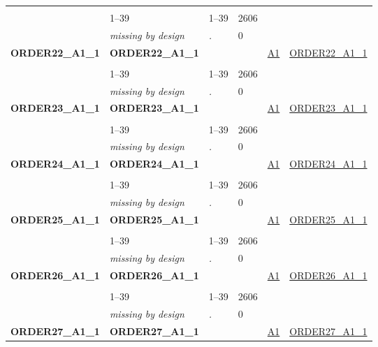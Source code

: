 \begin{longtable}{| L{2.45cm} | L{6cm} | C{1.5cm} | R{1cm} | C{2.25cm} | C{2.25cm} |}
   &  &  &  &  &  \\ 
   & 1--39 & 1--39 & 2606 &  &  \\ 
   & \textit{missing by design} & \textit{.} & 0 &  &  \\ 
   \midrule
\textbf{ORDER22\_A1\_1}\label{var:ORDER22:A1:1} & \textbf{ORDER22\_A1\_1} &  &  & \hyperref[A1]{A1} & \hyperref[var:suf:ORDER22:A1:1]{ORDER22\_A1\_1} \\ 
   &  &  &  &  &  \\ 
   & 1--39 & 1--39 & 2606 &  &  \\ 
   & \textit{missing by design} & \textit{.} & 0 &  &  \\ 
   \midrule
\textbf{ORDER23\_A1\_1}\label{var:ORDER23:A1:1} & \textbf{ORDER23\_A1\_1} &  &  & \hyperref[A1]{A1} & \hyperref[var:suf:ORDER23:A1:1]{ORDER23\_A1\_1} \\ 
   &  &  &  &  &  \\ 
   & 1--39 & 1--39 & 2606 &  &  \\ 
   & \textit{missing by design} & \textit{.} & 0 &  &  \\ 
   \midrule
\textbf{ORDER24\_A1\_1}\label{var:ORDER24:A1:1} & \textbf{ORDER24\_A1\_1} &  &  & \hyperref[A1]{A1} & \hyperref[var:suf:ORDER24:A1:1]{ORDER24\_A1\_1} \\ 
   &  &  &  &  &  \\ 
   & 1--39 & 1--39 & 2606 &  &  \\ 
   & \textit{missing by design} & \textit{.} & 0 &  &  \\ 
   \midrule
\textbf{ORDER25\_A1\_1}\label{var:ORDER25:A1:1} & \textbf{ORDER25\_A1\_1} &  &  & \hyperref[A1]{A1} & \hyperref[var:suf:ORDER25:A1:1]{ORDER25\_A1\_1} \\ 
   &  &  &  &  &  \\ 
   & 1--39 & 1--39 & 2606 &  &  \\ 
   & \textit{missing by design} & \textit{.} & 0 &  &  \\ 
   \midrule
\textbf{ORDER26\_A1\_1}\label{var:ORDER26:A1:1} & \textbf{ORDER26\_A1\_1} &  &  & \hyperref[A1]{A1} & \hyperref[var:suf:ORDER26:A1:1]{ORDER26\_A1\_1} \\ 
   &  &  &  &  &  \\ 
   & 1--39 & 1--39 & 2606 &  &  \\ 
   & \textit{missing by design} & \textit{.} & 0 &  &  \\ 
   \midrule
\textbf{ORDER27\_A1\_1}\label{var:ORDER27:A1:1} & \textbf{ORDER27\_A1\_1} &  &  & \hyperref[A1]{A1} & \hyperref[var:suf:ORDER27:A1:1]{ORDER27\_A1\_1} \\ 

\end{longtable}
